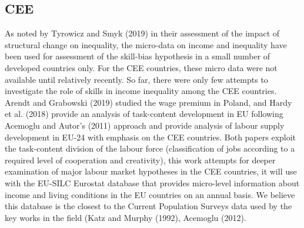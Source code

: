 \documentclass{article}
\begin{document}
\subsection{CEE}
As noted by Tyrowicz and Smyk (2019) in their assessment of the impact of structural change on inequality, the micro-data on income and inequality have been used for assessment of the skill-bias hypothesis in a small number of developed countries only. For the CEE countries, these micro data were not available until relatively recently.
So far, there were only few attempts to investigate the role of skills in income inequality among the CEE countries. Arendt and Grabowski (2019) studied the wage premium in Poland, and Hardy et al. (2018) provide an analysis of task-content development in EU following Acemoglu and Autor's (2011) approach and provide analysis of labour supply development in EU-24 with emphasis on the CEE countries. Both papers exploit the task-content division of the labour force (classification of jobs according to a required level of cooperation and creativity), this work attempts for deeper examination of major labour market hypotheses in the CEE countries, it will use with the EU-SILC Eurostat database that provides micro-level information about income and living conditions in the EU countries on an annual basis. We believe this database is the closest to the Current Population Surveys data used by the key works in the field (Katz and Murphy (1992), Acemoglu (2012).
\end{document}
